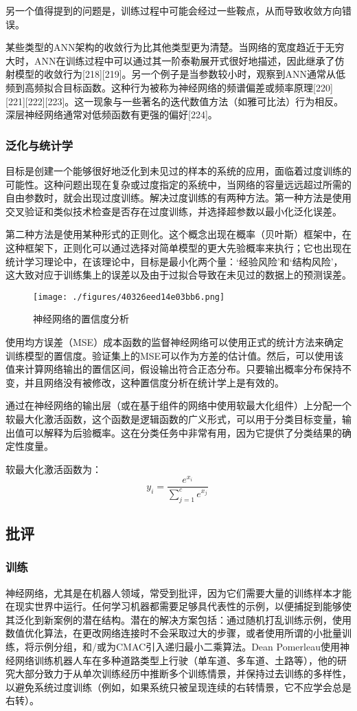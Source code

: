 另一个值得提到的问题是，训练过程中可能会经过一些鞍点，从而导致收敛方向错误。

某些类型的ANN架构的收敛行为比其他类型更为清楚。当网络的宽度趋近于无穷大时，ANN在训练过程中可以通过其一阶泰勒展开式很好地描述，因此继承了仿射模型的收敛行为[218][219]。另一个例子是当参数较小时，观察到ANN通常从低频到高频拟合目标函数。这种行为被称为神经网络的频谱偏差或频率原理[220][221][222][223]。这一现象与一些著名的迭代数值方法（如雅可比法）行为相反。深层神经网络通常对低频函数有更强的偏好[224]。
\subsubsection{泛化与统计学}
目标是创建一个能够很好地泛化到未见过的样本的系统的应用，面临着过度训练的可能性。这种问题出现在复杂或过度指定的系统中，当网络的容量远远超过所需的自由参数时，就会出现过度训练。解决过度训练的有两种方法。第一种方法是使用交叉验证和类似技术检查是否存在过度训练，并选择超参数以最小化泛化误差。

第二种方法是使用某种形式的正则化。这个概念出现在概率（贝叶斯）框架中，在这种框架下，正则化可以通过选择对简单模型的更大先验概率来执行；它也出现在统计学习理论中，在该理论中，目标是最小化两个量：‘经验风险’和‘结构风险’，这大致对应于训练集上的误差以及由于过拟合导致在未见过的数据上的预测误差。
\begin{figure}[ht]
\centering
\texttt{[image: ./figures/40326eed14e03bb6.png]}
\caption{神经网络的置信度分析} \label{fig_RGSJ_4}
\end{figure}
使用均方误差（MSE）成本函数的监督神经网络可以使用正式的统计方法来确定训练模型的置信度。验证集上的MSE可以作为方差的估计值。然后，可以使用该值来计算网络输出的置信区间，假设输出符合正态分布。只要输出概率分布保持不变，并且网络没有被修改，这种置信度分析在统计学上是有效的。

通过在神经网络的输出层（或在基于组件的网络中使用软最大化组件）上分配一个软最大化激活函数，这个函数是逻辑函数的广义形式，可以用于分类目标变量，输出值可以解释为后验概率。这在分类任务中非常有用，因为它提供了分类结果的确定性度量。

软最大化激活函数为：
\[
y_i = \frac{e^{x_i}}{\sum_{j=1}^{c} e^{x_j}}~
\]
\subsection{批评}
\subsubsection{训练}
神经网络，尤其是在机器人领域，常受到批评，因为它们需要大量的训练样本才能在现实世界中运行。任何学习机器都需要足够具代表性的示例，以便捕捉到能够使其泛化到新案例的潜在结构。潜在的解决方案包括：通过随机打乱训练示例，使用数值优化算法，在更改网络连接时不会采取过大的步骤，或者使用所谓的小批量训练，将示例分组，和/或为CMAC引入递归最小二乘算法。Dean Pomerleau使用神经网络训练机器人车在多种道路类型上行驶（单车道、多车道、土路等），他的研究大部分致力于从单次训练经历中推断多个训练情景，并保持过去训练的多样性，以避免系统过度训练（例如，如果系统只被呈现连续的右转情景，它不应学会总是右转）。
